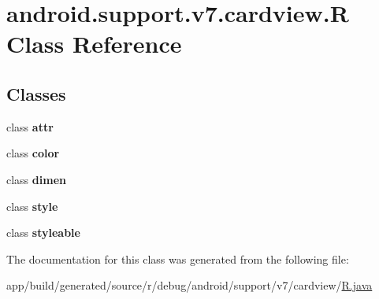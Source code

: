 \hypertarget{classandroid_1_1support_1_1v7_1_1cardview_1_1_r}{}\section{android.\+support.\+v7.\+cardview.\+R Class Reference}
\label{classandroid_1_1support_1_1v7_1_1cardview_1_1_r}
\subsection*{Classes}
\begin{DoxyCompactItemize}
\item 
class {\bfseries attr}
\item 
class {\bfseries color}
\item 
class {\bfseries dimen}
\item 
class {\bfseries style}
\item 
class {\bfseries styleable}
\end{DoxyCompactItemize}


The documentation for this class was generated from the following file\+:\begin{DoxyCompactItemize}
\item 
app/build/generated/source/r/debug/android/support/v7/cardview/\hyperlink{app_2build_2generated_2source_2r_2debug_2android_2support_2v7_2cardview_2_r_8java}{R.\+java}\end{DoxyCompactItemize}
